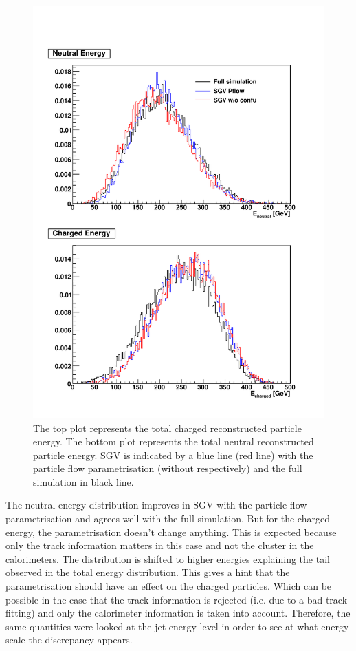 \begin{figure}[t]
  \centering
  \includegraphics[width=1\linewidth]{chap6/fig_SGV/Total_EneuEcha_notjet.pdf}
  \caption{The top plot represents the total charged reconstructed particle energy. The bottom plot represents the total neutral reconstructed particle energy. SGV is indicated by a blue line (red line) with the particle flow parametrisation (without respectively) and the full simulation in black line.}
  \label{fig:energy_charged_neutral}
\end{figure}

The neutral energy distribution improves in SGV with the particle flow parametrisation and agrees well with the full simulation. But for the charged energy, the parametrisation doesn't change anything. This is expected because only the track information matters in this case and not the cluster in the calorimeters. The distribution is shifted to higher energies explaining the tail observed in the total energy distribution. This gives a hint that the parametrisation should have an effect on the charged particles. Which can be possible in the case that the track information is rejected (i.e. due to a bad track fitting) and only the calorimeter information is taken into account. Therefore, the same quantities were looked at the jet energy level in order to see at what energy scale the discrepancy appears.

